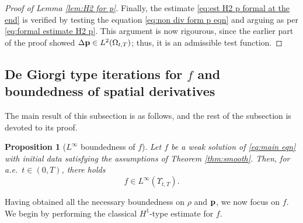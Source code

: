 \documentclass[11pt,a4paper,reqno]{amsart}
\newtheorem{prop}{Proposition}[section]
\theoremstyle{remark}
\theoremstyle{definition}
\numberwithin{equation}{section}
\newcommand{\p}{{\bf p}}
\begin{document}
\begin{proof}[Proof of Lemma \ref{lem:H2 for p}]
Finally, the estimate \eqref{eq:est H2 p formal at the end} is verified by testing the equation \eqref{eq:non div form p eqn} and arguing as per \eqref{eq:formal estimate H2 p}. This argument is now rigourous, since the earlier part of the proof showed $\Delta \p \in L^2(\Omega_{t,T})$; thus, it is an admissible test function.
\end{proof}











  

\subsection{De Giorgi type iterations for $f$ and boundedness of spatial derivatives}

The main result of this subsection is as follows, and the rest of the subsection is devoted to its proof. 

\begin{prop}[$L^\infty$ boundedness of $f$]\label{lem:Linfty for f}
    Let $f$ be a weak solution of \eqref{eq:main eqn} with initial data satisfying the assumptions of Theorem \ref{thm:smooth}. Then, for a.e.~$t \in (0,T)$, there holds $$f \in L^\infty(\Upsilon_{t,T}).$$ 
\end{prop}

Having obtained all the necessary boundedness on $\rho$ and $\p$, we now focus on $f$. We begin by performing the classical $H^1$-type estimate for $f$. 
\end{document}
